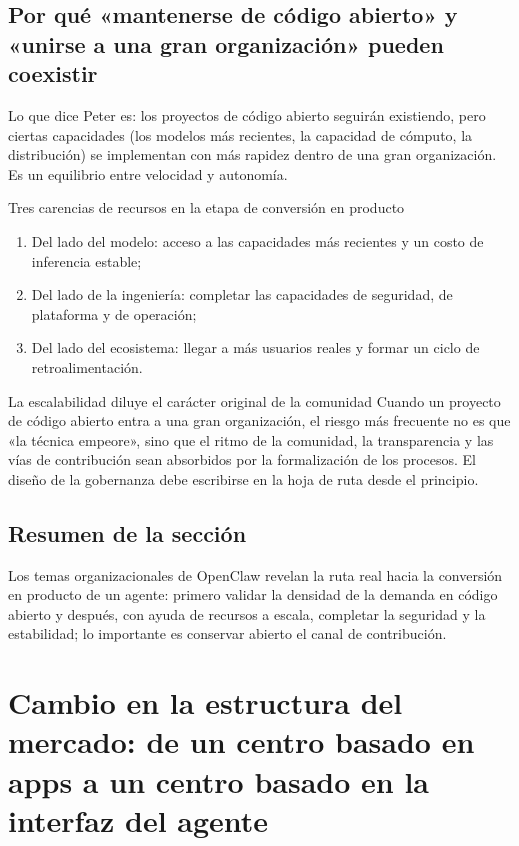 \documentclass[a4paper]{article}
\begin{document}
\subsection{Por qué «mantenerse de código abierto» y «unirse a una gran organización» pueden coexistir}

Lo que dice Peter es: los proyectos de código abierto seguirán existiendo, pero ciertas capacidades (los modelos más recientes, la capacidad de cómputo, la distribución) se implementan con más rapidez dentro de una gran organización. Es un equilibrio entre velocidad y autonomía.

\begin{importantbox}{Tres carencias de recursos en la etapa de conversión en producto}
\begin{enumerate}
    \item Del lado del modelo: acceso a las capacidades más recientes y un costo de inferencia estable;
    \item Del lado de la ingeniería: completar las capacidades de seguridad, de plataforma y de operación;
    \item Del lado del ecosistema: llegar a más usuarios reales y formar un ciclo de retroalimentación.
\end{enumerate}
\end{importantbox}

\begin{warningbox}{La escalabilidad diluye el carácter original de la comunidad}
Cuando un proyecto de código abierto entra a una gran organización, el riesgo más frecuente no es que «la técnica empeore», sino que el ritmo de la comunidad, la transparencia y las vías de contribución sean absorbidos por la formalización de los procesos. El diseño de la gobernanza debe escribirse en la hoja de ruta desde el principio.
\end{warningbox}

\subsection{Resumen de la sección}
Los temas organizacionales de OpenClaw revelan la ruta real hacia la conversión en producto de un agente: primero validar la densidad de la demanda en código abierto y después, con ayuda de recursos a escala, completar la seguridad y la estabilidad; lo importante es conservar abierto el canal de contribución.

\section{Cambio en la estructura del mercado: de un centro basado en apps a un centro basado en la interfaz del agente}
\end{document}
